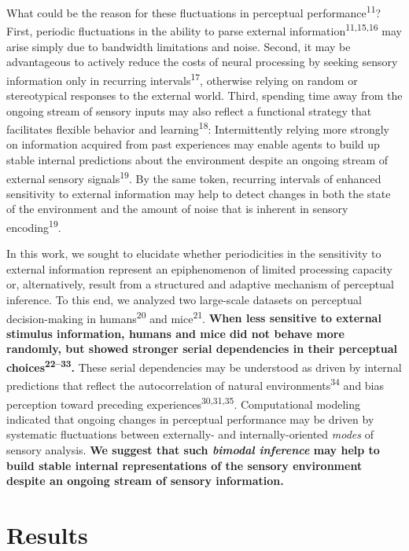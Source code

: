 \documentclass[
]{article}
\begin{document}
What could be the reason for these fluctuations in perceptual
performance\textsuperscript{11}? First, periodic fluctuations in the
ability to parse external information\textsuperscript{11,15,16} may
arise simply due to bandwidth limitations and noise. Second, it may be
advantageous to actively reduce the costs of neural processing by
seeking sensory information only in recurring
intervals\textsuperscript{17}, otherwise relying on random or
stereotypical responses to the external world. Third, spending time away
from the ongoing stream of sensory inputs may also reflect a functional
strategy that facilitates flexible behavior and
learning\textsuperscript{18}: Intermittently relying more strongly on
information acquired from past experiences may enable agents to build up
stable internal predictions about the environment despite an ongoing
stream of external sensory signals\textsuperscript{19}. By the same
token, recurring intervals of enhanced sensitivity to external
information may help to detect changes in both the state of the
environment and the amount of noise that is inherent in sensory
encoding\textsuperscript{19}.

In this work, we sought to elucidate whether periodicities in the
sensitivity to external information represent an epiphenomenon of
limited processing capacity or, alternatively, result from a structured
and adaptive mechanism of perceptual inference. To this end, we analyzed
two large-scale datasets on perceptual decision-making in
humans\textsuperscript{20} and mice\textsuperscript{21}. \textbf{When
less sensitive to external stimulus information, humans and mice did not
behave more randomly, but showed stronger serial dependencies in their
perceptual choices\textsuperscript{22--33}.} These serial dependencies
may be understood as driven by internal predictions that reflect the
autocorrelation of natural environments\textsuperscript{34} and bias
perception toward preceding experiences\textsuperscript{30,31,35}.
Computational modeling indicated that ongoing changes in perceptual
performance may be driven by systematic fluctuations between externally-
and internally-oriented \emph{modes} of sensory analysis. \textbf{We
suggest that such \emph{bimodal inference} may help to build stable
internal representations of the sensory environment despite an ongoing
stream of sensory information.}

\hypertarget{results}{%
\section{Results}\label{results}}
\end{document}
